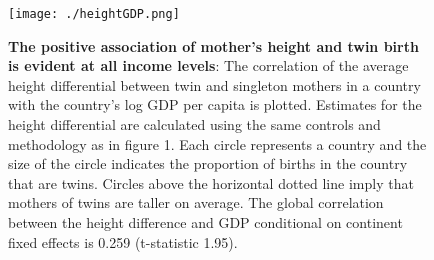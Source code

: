 \documentclass{nature}
\begin{document}
\begin{linenumbers}
\begin{spacing}{1}
\begin{figure}[htpb!]
  \texttt{[image: ./heightGDP.png]}
\vspace{5mm}
\caption{\textbf{The positive association of mother's height and twin birth is evident at all income levels}: {\footnotesize The correlation of the average height differential between twin and singleton mothers in a country with the country's log GDP per capita is plotted.  Estimates for the height differential are calculated using the same controls and methodology as in figure 1.
Each circle represents a country and the size of the circle indicates the proportion of births in the country that are twins. Circles above the horizontal dotted line imply that mothers of twins are taller on average. The global correlation between the height difference and GDP conditional on continent fixed effects is 0.259 (t-statistic 1.95).}} %
\label{fig:GDPEsts}
\end{figure}



\end{spacing}
\end{linenumbers}
\end{document}
